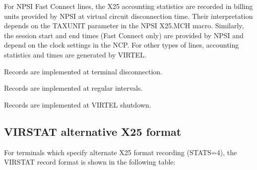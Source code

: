 \documentclass[letterpaper,10pt,english]{sphinxmanual}
\begin{document}
\sphinxAtStartPar
{}

\sphinxAtStartPar
For NPSI Fast Connect lines, the X25 accounting statistics are recorded in billing units provided by NPSI at virtual circuit disconnection time. Their interpretation depends on the TAXUNIT parameter in the NPSI X25.MCH macro. Similarly, the session start and end times (Fast Connect only) are provided by NPSI and depend on the clock settings in the NCP. For other types of lines, accounting statistics and times are generated by VIRTEL.
\begin{description}
\sphinxAtStartPar
Records are implemented at terminal disconnection.

\sphinxAtStartPar
Records are implemented at regular intervals.

\sphinxAtStartPar
Records are implemented at VIRTEL shutdown.

\end{description}

\newpage

\ignorespaces 

\subsection{VIRSTAT alternative X25 format}
\label{\detokenize{audit_operations_ and_performance:virstat-alternative-x25-format}}\label{\detokenize{audit_operations_ and_performance:index-86}}
\sphinxAtStartPar
For terminals which specify alternate X25 format recording (STATS=4), the VIRSTAT record format is shown in the following  table:
\end{document}
